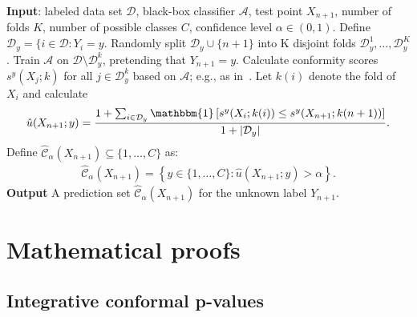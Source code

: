 \documentclass[11pt]{article}
\newcommand{\I}[1]{\mathbbm{1}\left[#1\right]}
\begin{document}
\begin{algorithm}[H]
  \caption{TCV+ label-conditional prediction sets for multi-class classification}
  \label{alg_cv++-label-conditional}
  \begin{algorithmic}[1]
    \State \textbf{Input}: labeled data set $\mathcal{D}$, black-box classifier  $\mathcal{A}$, test point $X_{n+1}$, number of folds $K$, number of possible classes $C$, confidence level $\alpha \in (0,1)$.
    \State Define $\mathcal{D}_y = \{i \in \mathcal{D} : Y_i = y$.
    \State Randomly split $\mathcal{D}_y \cup \{n+1\}$ into K disjoint folds $\mathcal{D}_y^1, \dots, \mathcal{D}_y^K$.
    \State Train $\mathcal{A}$ on $\mathcal{D} \setminus \mathcal{D}_y^k$, pretending that $Y_{n+1}=y$.
    \State Calculate conformity scores $s^y(X_j; k)$ for all $j\in \mathcal{D}_y^k$ based on $\mathcal{A}$; e.g., as in~\cite{romano2020classification}.
    \EndFor
    \State Let $k(i)$ denote the fold of $X_i$ and calculate
    \begin{align*}
      \hat{u}(X_{n+1}; y) = \frac{1+\sum_{i \in \mathcal{D}_y} \I{ s^y(X_{i}; k(i)) \leq s^y(X_{n+1}; k(n+1))} }{1+|\mathcal{D}_y|}.
    \end{align*}
    Define $\hat{\mathcal{C}}_{\alpha}(X_{n+1}) \subseteq \{1,\ldots, C\}$  as:
    \begin{align*}
      \hat{\mathcal{C}}_{\alpha}(X_{n+1}) = \left\{ y \in \{1,\ldots, C\} : \hat{u}(X_{n+1}; y) > \alpha \right\}.
    \end{align*}
  \EndFor
    \State \textbf{Output} A prediction set $\hat{\mathcal{C}}_{\alpha}(X_{n+1})$ for the unknown label $Y_{n+1}$.
  \end{algorithmic}
\end{algorithm}



\section{Mathematical proofs} \label{appendix:proofs}

\subsection{Integrative conformal p-values}
\end{document}
